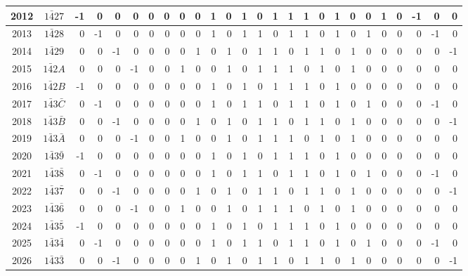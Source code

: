 \documentclass[12 pt]{article}%
\begin{document}
\begin{tiny}
\begin{centering}
\begin{longtable}{|c|c||rrrrrrrrrrrrrrrrrrrrrrrr|}
      \hline
      2012 & $1\bar427$ & -1 & 0 & 0 & 0 & 0 & 0 & 0 & 0 & 1 & 0 & 1 & 0 & 1 & 1 & 1 & 0 & 1 & 0 & 0 & 1 & 0 & -1 & 0 & 0 \\
      \hline
      2013 & $1\bar428$ & 0 & -1 & 0 & 0 & 0 & 0 & 0 & 0 & 1 & 0 & 1 & 1 & 0 & 1 & 1 & 0 & 1 & 0 & 1 & 0 & 0 & 0 & -1 & 0 \\
      \hline
      2014 & $1\bar429$ & 0 & 0 & -1 & 0 & 0 & 0 & 0 & 1 & 0 & 1 & 0 & 1 & 1 & 0 & 1 & 1 & 0 & 1 & 0 & 0 & 0 & 0 & 0 & -1 \\
      \hline
      2015 & $1\bar42A$ & 0 & 0 & 0 & -1 & 0 & 0 & 1 & 0 & 0 & 1 & 0 & 1 & 1 & 1 & 0 & 1 & 0 & 1 & 0 & 0 & 0 & 0 & 0 & 0 \\
      \hline
      2016 & $1\bar42B$ & -1 & 0 & 0 & 0 & 0 & 0 & 0 & 0 & 1 & 0 & 1 & 0 & 1 & 1 & 1 & 0 & 1 & 0 & 0 & 0 & 0 & 0 & 0 & 0 \\
      \hline
      2017 & $1\bar43\bar C$ & 0 & -1 & 0 & 0 & 0 & 0 & 0 & 0 & 1 & 0 & 1 & 1 & 0 & 1 & 1 & 0 & 1 & 0 & 1 & 0 & 0 & 0 & -1 & 0 \\
      \hline
      2018 & $1\bar43\bar B$ & 0 & 0 & -1 & 0 & 0 & 0 & 0 & 1 & 0 & 1 & 0 & 1 & 1 & 0 & 1 & 1 & 0 & 1 & 0 & 0 & 0 & 0 & 0 & -1 \\
      \hline
      2019 & $1\bar43\bar A$ & 0 & 0 & 0 & -1 & 0 & 0 & 1 & 0 & 0 & 1 & 0 & 1 & 1 & 1 & 0 & 1 & 0 & 1 & 0 & 0 & 0 & 0 & 0 & 0 \\
      \hline
      2020 & $1\bar43\bar9$ & -1 & 0 & 0 & 0 & 0 & 0 & 0 & 0 & 1 & 0 & 1 & 0 & 1 & 1 & 1 & 0 & 1 & 0 & 0 & 0 & 0 & 0 & 0 & 0 \\
      \hline
      2021 & $1\bar43\bar8$ & 0 & -1 & 0 & 0 & 0 & 0 & 0 & 0 & 1 & 0 & 1 & 1 & 0 & 1 & 1 & 0 & 1 & 0 & 1 & 0 & 0 & 0 & -1 & 0 \\
      \hline
      2022 & $1\bar43\bar7$ & 0 & 0 & -1 & 0 & 0 & 0 & 0 & 1 & 0 & 1 & 0 & 1 & 1 & 0 & 1 & 1 & 0 & 1 & 0 & 0 & 0 & 0 & 0 & -1 \\
      \hline
      2023 & $1\bar43\bar6$ & 0 & 0 & 0 & -1 & 0 & 0 & 1 & 0 & 0 & 1 & 0 & 1 & 1 & 1 & 0 & 1 & 0 & 1 & 0 & 0 & 0 & 0 & 0 & 0 \\
      \hline
      2024 & $1\bar43\bar5$ & -1 & 0 & 0 & 0 & 0 & 0 & 0 & 0 & 1 & 0 & 1 & 0 & 1 & 1 & 1 & 0 & 1 & 0 & 0 & 0 & 0 & 0 & 0 & 0 \\
      \hline
      2025 & $1\bar43\bar4$ & 0 & -1 & 0 & 0 & 0 & 0 & 0 & 0 & 1 & 0 & 1 & 1 & 0 & 1 & 1 & 0 & 1 & 0 & 1 & 0 & 0 & 0 & -1 & 0 \\
      \hline
      2026 & $1\bar43\bar3$ & 0 & 0 & -1 & 0 & 0 & 0 & 0 & 1 & 0 & 1 & 0 & 1 & 1 & 0 & 1 & 1 & 0 & 1 & 0 & 0 & 0 & 0 & 0 & -1 \\

\end{longtable}
\end{centering}
\end{tiny}
\end{document}
